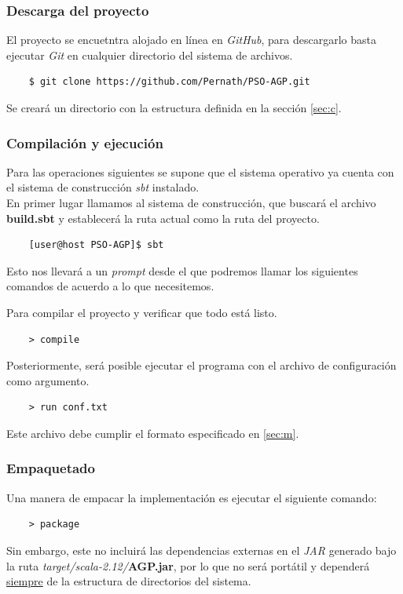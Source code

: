 \documentclass[12pt]{article}
\begin{document}
\subsubsection*{Descarga del proyecto}
El proyecto se encuetntra alojado en línea en \textit{GitHub}, para
descargarlo basta ejecutar \textit{Git} en cualquier directorio del
sistema de archivos.
\begin{verbatim}
    $ git clone https://github.com/Pernath/PSO-AGP.git
\end{verbatim}
Se creará un directorio con la estructura definida en la sección \ref{sec:c}.
\subsubsection*{Compilación y ejecución}
Para las operaciones siguientes se supone que el sistema operativo ya cuenta con el sistema de construcción \textit{sbt} instalado.\\

\noindent
En primer lugar llamamos al sistema de construcción, que buscará el
archivo \textbf{build.sbt} y establecerá la ruta actual como la ruta
del proyecto.
\begin{verbatim}
    [user@host PSO-AGP]$ sbt
\end{verbatim}
Esto nos llevará a un \textit{prompt} desde el que podremos llamar
los siguientes comandos de acuerdo a lo que necesitemos.

Para compilar el proyecto y verificar que todo está listo.
\begin{verbatim}
    > compile
\end{verbatim}
Posteriormente, será posible ejecutar el programa con el archivo de configuración como argumento.
\begin{verbatim}
    > run conf.txt
\end{verbatim}
Este archivo debe cumplir el formato especificado en \ref{sec:m}.
\subsubsection*{Empaquetado}
Una manera de empacar la implementación es ejecutar el siguiente comando:
\begin{verbatim}
    > package
\end{verbatim}
Sin embargo, este no incluirá las dependencias externas en el \textit{JAR} generado bajo la ruta \textit{target/scala-2.12/}\textbf{AGP.jar}, por lo que no será portátil y dependerá \underline{siempre} de la estructura de directorios del sistema.
\end{document}
